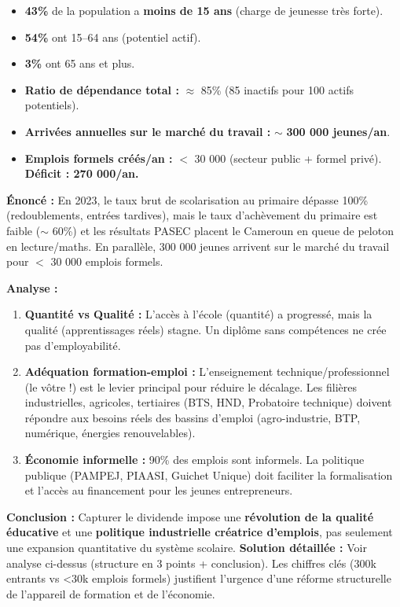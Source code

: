 \documentclass[11pt]{article}
\begin{document}
\begin{aretenir}
\begin{itemize}
    \item \textbf{43\%} de la population a \textbf{moins de 15 ans} (charge de jeunesse très forte).
    \item \textbf{54\%} ont 15--64 ans (potentiel actif).
    \item \textbf{3\%} ont 65 ans et plus.
    \item \textbf{Ratio de dépendance total :} $\approx$ 85\% (85 inactifs pour 100 actifs potentiels).
    \item \textbf{Arrivées annuelles sur le marché du travail :} $\sim$ \textbf{300 000 jeunes/an}.
    \item \textbf{Emplois formels créés/an :} $<$ 30 000 (secteur public + formel privé). \textbf{Déficit : 270 000/an.}
\end{itemize}
\end{aretenir}

\begin{exoresolu}
\textbf{Énoncé :} En 2023, le taux brut de scolarisation au primaire dépasse 100\% (redoublements, entrées tardives), mais le taux d'achèvement du primaire est faible ($\sim$ 60\%) et les résultats PASEC placent le Cameroun en queue de peloton en lecture/maths. En parallèle, 300 000 jeunes arrivent sur le marché du travail pour $<$ 30 000 emplois formels.

\textbf{Analyse :}
\begin{enumerate}
    \item \textbf{Quantité vs Qualité :} L'accès à l'école (quantité) a progressé, mais la qualité (apprentissages réels) stagne. Un diplôme sans compétences ne crée pas d'employabilité.
    \item \textbf{Adéquation formation-emploi :} L'enseignement technique/professionnel (le vôtre !) est le levier principal pour réduire le décalage. Les filières industrielles, agricoles, tertiaires (BTS, HND, Probatoire technique) doivent répondre aux besoins réels des bassins d'emploi (agro-industrie, BTP, numérique, énergies renouvelables).
    \item \textbf{Économie informelle :} 90\% des emplois sont informels. La politique publique (PAMPEJ, PIAASI, Guichet Unique) doit faciliter la formalisation et l'accès au financement pour les jeunes entrepreneurs.
\end{enumerate}
\textbf{Conclusion :} Capturer le dividende impose une \textbf{révolution de la qualité éducative} et une \textbf{politique industrielle créatrice d'emplois}, pas seulement une expansion quantitative du système scolaire.
\tcblower
\textbf{Solution détaillée :} Voir analyse ci-dessus (structure en 3 points + conclusion). Les chiffres clés (300k entrants vs <30k emplois formels) justifient l'urgence d'une réforme structurelle de l'appareil de formation et de l'économie.
\end{exoresolu}
\end{document}
